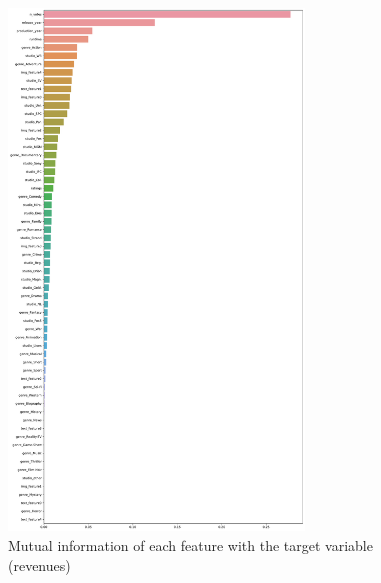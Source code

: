 \begin{figure}[H]
	\centering
	\includegraphics[width=0.7\textwidth]{figures/mi_with_target.pdf}
	\caption{Mutual information of each feature with the target variable (revenues)}
	\label{fig:mi_with_target}
\end{figure}